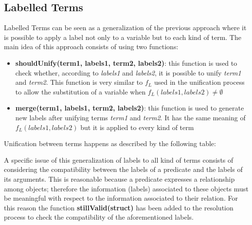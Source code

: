 \subsection{Labelled Terms}\label{subsec:labelled_terms}
Labelled Terms can be seen as a generalization of the previous approach where it is possible to apply a label not only to a variable
but to each kind of term. The main idea of this approach consists of using two functions:
\begin{itemize}
    \item \textbf{shouldUnify(term1, labels1, term2, labels2)}: this function is used to check whether, according to \textit{labels1} and \textit{labels2},
    it is possible to unify \textit{term1} and \textit{term2}. This function is very similar to $f_L$ used in
    the unification process to allow the substitution of a variable when $f_L(labels1,labels2) \neq \emptyset$
    \item \textbf{merge(term1, labels1, term2, labels2)}: this function is used to generate new labels after unifying terms \textit{term1} and \textit{term2}.
    It has the same meaning of $f_L(labels1,labels2)$ but it is applied to every kind of term
\end{itemize}
Unification between terms happens as described by the following table:

A specific issue of this generalization of labels to all kind of terms consists of considering the compatibility between the labels of a predicate and
the labels of its arguments.\newline
This is reasonable because a predicate expresses a relationship among objects; therefore the information (labels) associated to these objects
must be meaningful with respect to the information associated to their relation.\newline
For this reason the function \textbf{stillValid(struct)} has been added to the resolution process to check the compatibility
of the aforementioned labels.

